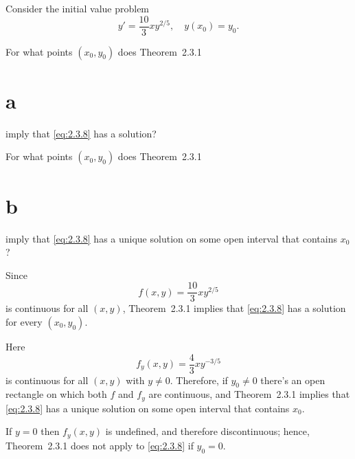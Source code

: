 \setcounter{example}{4}
\setcounter{equation}{7}
\begin{example}
  \label{example:2.3.5} \rm Consider the initial value problem
  \begin{equation}
    \label{eq:2.3.8}y'=\frac{10}{3}xy^{2/5},\quad y(x_{0})=y_{0}.
  \end{equation}
  \begin{alist}
    \item %
    For what points $(x_{0},y_{0})$ does Theorem~2.3.1\part{a} imply that
    \eqref{eq:2.3.8} has a solution?

    \item %
    For what points $(x_{0},y_{0})$ does Theorem~2.3.1\part{b} imply that
    \eqref{eq:2.3.8} has a unique solution on some open interval that contains $x_{0}$?
  \end{alist}
\end{example}
\begin{examplesolution}
 Since
\[
  f(x,y)=\frac{10}{3}xy^{2/5}
\]
is continuous for all $(x,y)$, Theorem~2.3.1 implies that \eqref{eq:2.3.8} has a
solution for every $(x_{0},y_{0})$.

 Here
\[
  f_{y}(x,y)=\frac{4}{3}xy^{-3/5}
\]
is continuous for all $(x,y)$ with $y\ne0$. Therefore, if $y_{0}\ne0$ there's an open rectangle on
which both $f$ and $f_{y}$ are continuous, and Theorem~2.3.1 implies that
\eqref{eq:2.3.8} has a unique solution on some open interval that contains $x_{0}$.

If $y=0$ then $f_{y}(x,y)$ is undefined, and therefore discontinuous; hence,
Theorem~2.3.1 does not apply to \eqref{eq:2.3.8} if $y_{0}=0$.
\end{examplesolution}

